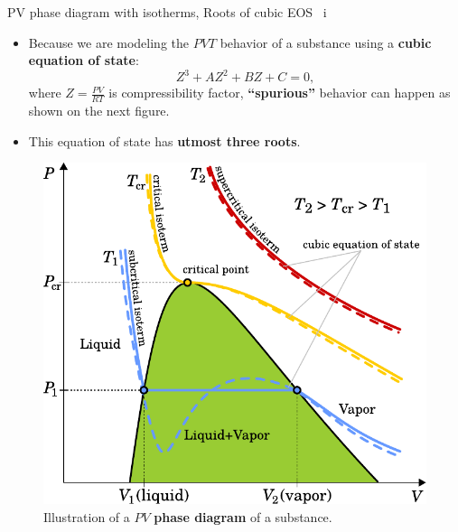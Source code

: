\begin{frame}{PV phase diagram with isotherms, Roots of cubic EOS \, i}

\lcol
\begin{itemize}
\item Because we are modeling the $PVT$ behavior of a substance
using a \alert{\bf cubic equation of state}:
\[
Z^{3}+AZ^{2}+BZ+C=0,
\]
where $Z=\tfrac{PV}{RT}$ is compressibility factor, 
\textbf{“spurious”} behavior can happen as shown on the next figure.
\item This equation of state has \textbf{utmost three roots}. 
\end{itemize}
\rcol

\begin{figure}
\centering 
\includegraphics[width=1\textwidth]{figures/activity-models/phase-diagram-pv-cubic-eos}
\caption{\footnotesize Illustration of a $PV$ \textbf{phase diagram} of a substance.}
\end{figure}
\ecol
\end{frame}
%
